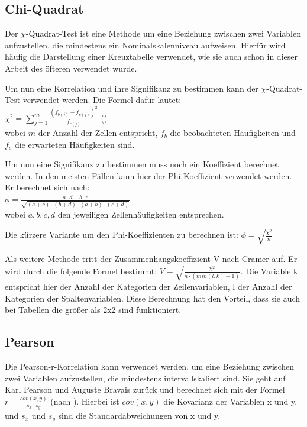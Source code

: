 \subsection{Chi-Quadrat}
\label{chisquared}
Der $\chi$-Quadrat-Test ist eine Methode um eine Beziehung zwischen zwei Variablen aufzustellen, die mindestens ein Nominalskalenniveau aufweisen.
Hierfür wird häufig die Darstellung einer Kreuztabelle verwendet, wie sie auch schon in dieser Arbeit des öfteren verwendet wurde.

Um nun eine Korrelation und ihre Signifikanz zu bestimmen kann der $\chi$-Quadrat-Test verwendet werden. Die Formel dafür lautet:\\
$\chi^2 = \sum_{j=1}^m \frac{(f_{b(j)} - f_{e(j)})^2}{f_{e(j)}}$ (\citet{statistikeinfuehrung})\\
wobei $m$ der Anzahl der Zellen entspricht, $f_b$ die beobachteten Häufigkeiten und $f_e$ die erwarteten Häufigkeiten sind.

Um nun eine Signifikanz zu bestimmen muss noch ein Koeffizient berechnet werden. In den meisten Fällen kann hier der Phi-Koeffizient verwendet werden. Er berechnet sich nach:\\
$\phi = \frac{a \cdot d - b \cdot c}{\sqrt{(a+c) \cdot (b+d) \cdot (a+b) \cdot (c+d)}}$\\
wobei $a, b, c, d$ den jeweiligen Zellenhäufigkeiten entsprechen.

Die kürzere Variante um den Phi-Koeffizienten zu berechnen ist: $\phi = \sqrt{\frac{\chi^2}{n}}$

Als weitere Methode tritt der Zusammenhangskoeffizient V nach Cramer auf. Er wird durch die folgende Formel bestimmt: $V = \sqrt{\frac{\chi^2}{n \cdot (min(l,k) - 1)}}$. Die Variable k entspricht hier der Anzahl der Kategorien der Zeilenvariablen, l der Anzahl der Kategorien der Spaltenvariablen. Diese Berechnung hat den Vorteil, dass sie auch bei Tabellen die größer als 2x2 sind funktioniert.

\subsection{Pearson}
\label{pearson}
Die Pearson-r-Korrelation kann verwendet werden, um eine Beziehung zwischen zwei Variablen aufzustellen, die mindestens intervallskaliert sind. Sie geht auf Karl Pearson und Auguste Bravais zurück und berechnet sich mit der Formel $r = \frac{cov(x,y)}{s_x \cdot s_y}$ (nach \citet{statistikeinfuehrung}). Hierbei ist $cov(x,y)$ die Kovarianz der Variablen x und y, und $s_x$ und $s_y$ sind die Standardabweichungen von x und y.

